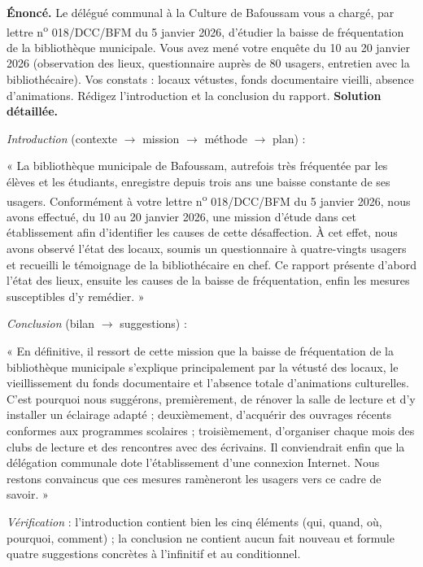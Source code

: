 \documentclass[11pt]{article}
\begin{document}
\begin{exoresolu}
\textbf{Énoncé.} Le délégué communal à la Culture de Bafoussam vous a chargé, par lettre n\textsuperscript{o} 018/DCC/BFM du 5 janvier 2026, d'étudier la baisse de fréquentation de la bibliothèque municipale. Vous avez mené votre enquête du 10 au 20 janvier 2026 (observation des lieux, questionnaire auprès de 80 usagers, entretien avec la bibliothécaire). Vos constats : locaux vétustes, fonds documentaire vieilli, absence d'animations. Rédigez l'introduction et la conclusion du rapport.
\tcblower
\textbf{Solution détaillée.}

\emph{Introduction} (contexte $\rightarrow$ mission $\rightarrow$ méthode $\rightarrow$ plan) :

« La bibliothèque municipale de Bafoussam, autrefois très fréquentée par les élèves et les étudiants, enregistre depuis trois ans une baisse constante de ses usagers. Conformément à votre lettre n\textsuperscript{o} 018/DCC/BFM du 5 janvier 2026, nous avons effectué, du 10 au 20 janvier 2026, une mission d'étude dans cet établissement afin d'identifier les causes de cette désaffection. À cet effet, nous avons observé l'état des locaux, soumis un questionnaire à quatre-vingts usagers et recueilli le témoignage de la bibliothécaire en chef. Ce rapport présente d'abord l'état des lieux, ensuite les causes de la baisse de fréquentation, enfin les mesures susceptibles d'y remédier. »

\emph{Conclusion} (bilan $\rightarrow$ suggestions) :

« En définitive, il ressort de cette mission que la baisse de fréquentation de la bibliothèque municipale s'explique principalement par la vétusté des locaux, le vieillissement du fonds documentaire et l'absence totale d'animations culturelles. C'est pourquoi nous suggérons, premièrement, de rénover la salle de lecture et d'y installer un éclairage adapté ; deuxièmement, d'acquérir des ouvrages récents conformes aux programmes scolaires ; troisièmement, d'organiser chaque mois des clubs de lecture et des rencontres avec des écrivains. Il conviendrait enfin que la délégation communale dote l'établissement d'une connexion Internet. Nous restons convaincus que ces mesures ramèneront les usagers vers ce cadre de savoir. »

\emph{Vérification} : l'introduction contient bien les cinq éléments (qui, quand, où, pourquoi, comment) ; la conclusion ne contient aucun fait nouveau et formule quatre suggestions concrètes à l'infinitif et au conditionnel.
\end{exoresolu}
\end{document}
